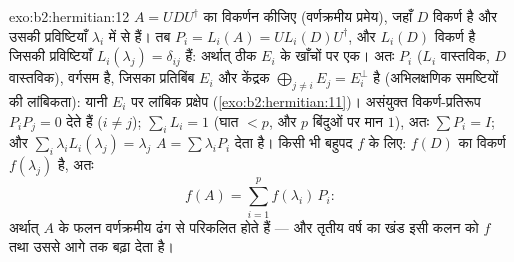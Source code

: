\begin{solution}{exo:b2:hermitian:12}
$A = U D U^\dagger$ का विकर्णन कीजिए (वर्णक्रमीय प्रमेय), जहाँ $D$ विकर्ण है और उसकी
प्रविष्टियाँ $\lambda_i$ में से हैं। तब $P_i = L_i(A) = U
L_i(D)U^\dagger$, और $L_i(D)$ विकर्ण है जिसकी प्रविष्टियाँ
$L_i(\lambda_j) = \delta_{ij}$ हैं: अर्थात् ठीक $E_i$ के खाँचों पर एक। अतः $P_i$  ($L_i$ वास्तविक,
$D$ वास्तविक), वर्गसम है, जिसका प्रतिबिंब $E_i$ और केंद्रक $\bigoplus_{j\neq i}E_j = E_i^\perp$ है
(अभिलक्षणिक समष्टियों की लांबिकता): यानी $E_i$ पर लांबिक प्रक्षेप (\cref{exo:b2:hermitian:11})।
असंयुक्त विकर्ण-प्रतिरूप $P_iP_j = 0$ देते हैं ($i \neq j$); $\sum_i L_i = 1$ (घात $< p$, और $p$
बिंदुओं पर मान $1$), अतः $\sum P_i = I$; और $\sum_i
\lambda_iL_i(\lambda_j) = \lambda_j$ $A = \sum
\lambda_iP_i$ देता है। किसी भी बहुपद $f$
के लिए: $f(D)$ का विकर्ण $f(\lambda_j)$ है, अतः
\[
f(A) = \sum_{i=1}^{p} f(\lambda_i)\,P_i :
\]
अर्थात् $A$ के फलन वर्णक्रमीय ढंग से परिकलित होते हैं --- और तृतीय वर्ष
का खंड इसी कलन को  $f$ तथा उससे आगे तक बढ़ा देता है।
\end{solution}


